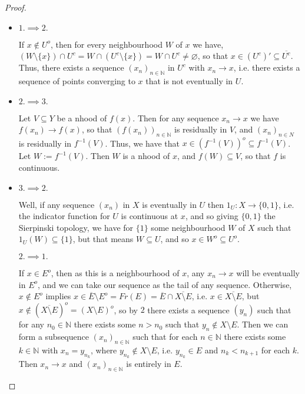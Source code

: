 \documentclass[12pt]{extarticle}
\newcommand{\set}[1]{\{#1\}}
\newcommand{\N}{\mathbb{N}}
\newcommand{\<}{\langle}
\renewcommand{\>}{\rangle}
\renewcommand{\emptyset}{\varnothing}
\theoremstyle{definition}
\begin{document}
\begin{proof}
  \begin{itemize}
  \item
    $1. \implies 2.$
    
    If $x \not \in U^o$, then for every neighbourhood $W$ of $x$ we have, $(W \setminus \set{x}) \cap U^c = W\cap (U^c \setminus \set{x}) = W \cap U^c \neq \emptyset$,
    so that $x \in (U^c)' \subseteq \overline{U^c}$. Thus, there exists a sequence $(x_n)_{n \in \N}$ in $U^c$ with $x_n \to x$, i.e. there exists a sequence of points converging to $x$ that is not eventually in $U$. 
  \item
    $2. \implies 3.$
    
    Let $V \subseteq Y$ be a nhood of $f(x)$. Then for any sequence $x_n \to x$ we have $f(x_n) \to f(x)$, so that $(f(x_n))_{n \in \N}$ is residually in $V$,
    and $(x_n)_{n \in N}$ is residually in $f^{-1}(V)$. Thus, we have that $x \in (f^{-1}(V))^o \subseteq f^{-1}(V)$. Let $W:=f^{-1}(V)$. Then $W$ is a nhood of $x$,
    and $f(W) \subseteq V$, so that $f$ is continuous. 
  \item
    $3. \implies 2.$

    Well, if any sequence $(x_n)$ in $X$ is eventually in $U$ then $1_U:X \to \set{0,1}$, i.e. the indicator function for $U$ is continuous at $x$, and so
    giving $\set{0,1}$ the Sierpinski topology, we have for $\set{1}$ some neighbourhood $W$ of $X$ such that $1_U(W) \subseteq \set{1}$, but that means $W \subseteq U$,
    and so $x \in W^o \subseteq U^o$.

    $2. \implies 1.$

    If $x \in E^o$, then as this is a neighbourhood of $x$, any $x_n \to x$ will be eventually in $E^o$, and we can take our sequence as the tail of any sequence.
    Otherwise, $x \not \in E^o$ implies $x \in \overline{E} \setminus E^o = Fr(E) = \overline{E} \cap \overline{X \setminus E}$, i.e. $x \in \overline{X \setminus E}$,
    but $x \not \in (\overline{X \setminus E})^o = (X \setminus E)^o$, so by $2$ there exists a sequence $(y_n)$ such that for any $n_0 \in \N$ there exists some $n > n_0$ such
    that $y_n \not \in X \setminus E$. Then we can form a subsequence $(x_n)_{n \in \N}$ such that for each $n \in \N$ there exists some $k \in \N$ with $x_n = y_{n_k}$,
    where $y_{n_k} \not \in X \setminus E$, i.e. $y_{n_k} \in E$ and $n_k < n_{k+1}$ for each $k$. Then $x_n \to x$ and $(x_n)_{n \in \N}$ is entirely in $E$. 
     
  \end{itemize}
\end{proof}
\end{document}
